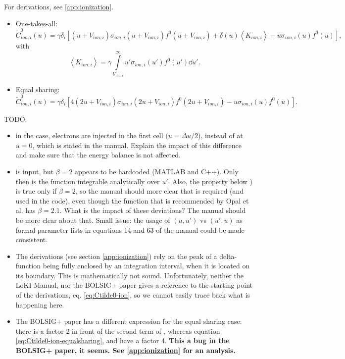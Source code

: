 \documentclass{book}
\newcommand{\MEAN}[1]{\ensuremath{\!\left\langle{{#1}}\right\rangle}}
\begin{document}
For derivations, see \ref{app:ionization}.
\begin{itemize}
	\item One-takes-all:
	\begin{equation}
		\tilde{C}^0_{ion,i}(u)
		=\gamma\delta_i\left[
			(u+V_{ion,i})\sigma_{ion,i}(u+V_{ion,i})f^0(u+V_{ion,i})
			+
			\delta(u)\MEAN{K_{ion,i}}
			-
			u\sigma_{ion,i}(u)f^0(u)
		\right],
		\label{eq:Ctilde0-ion-onetakesall}
	\end{equation}
	with
	\[
		\MEAN{K_{ion,i}} = \gamma\int\limits_{V_{ion,i}}^{\infty}u'\sigma_{ion,i}(u')f^0(u')\dd{u'}.
	\]
	\item Equal sharing:
	\begin{equation}
		\tilde{C}^0_{ion,i}(u)=\gamma\delta_i\left[
			4(2u+V_{ion,i})\sigma_{ion,i}(2u+V_{ion,i})f^0(2u+V_{ion,i})
			-
			u\sigma_{ion,i}(u)f^0(u)
		\right].
		\label{eq:Ctilde0-ion-equalsharing}
	\end{equation}
\end{itemize}


TODO:
\begin{itemize}
	\item in the  case, electrons are injected
		in the first cell $(u=\Delta u/2$), instead of at $u=0$,
		which is stated in the manual.
		Explain the impact of this difference and make sure
		that the energy balance is not affected.
        \item {} is input, but $\beta=2$ appears to be hardcoded (MATLAB and C++).
		Only then is the function integrable analytically over $u'$. Also,
		the property below \cite[eq. 63]{Manual_2_2_0}) is true only
		if $\beta=2$, so the manual should more clear that is required
		(and used in the code), even though the function that is
		recommended by Opal et al. \cite[fig. 4, text below tab. 1]{Opal1971}
		has $\beta=2.1$. What is the impact of these
		deviations? The manual should be more clear about that.
		Small issue: the usage of $(u,u')$ vs $(u',u)$ as formal parameter
		lists in equations 14 and 63 of the manual could be made consistent.
	\item The derivations (see section \ref{app:ionization}) rely on the peak
		of a delta-function being fully enclosed by an integration
		interval, when it is located on its boundary. This is mathematically
		not sound. Unfortunately, neither the LoKI Manual, nor the BOLSIG+
		paper gives a reference to the starting point of the derivations,
		eq. \eqref{eq:Ctilde0-ion}, so we cannot easily trace back what is
		happening here.
	\item The BOLSIG+ paper has a different expression for the equal sharing case:
		there is a factor 2 in front of the second term of \cite[eq. 29]{Hagelaar2005},
		whereas equation \eqref{eq:Ctilde0-ion-equalsharing},
		\cite[eq. 16]{Manual_2_2_0} and \cite[eq. 10]{Tejero2019} have a factor 4.
		{\bf This a bug in the BOLSIG+ paper, it seems. See \ref{app:ionization} for an analysis.}
\end{itemize}
\end{document}
